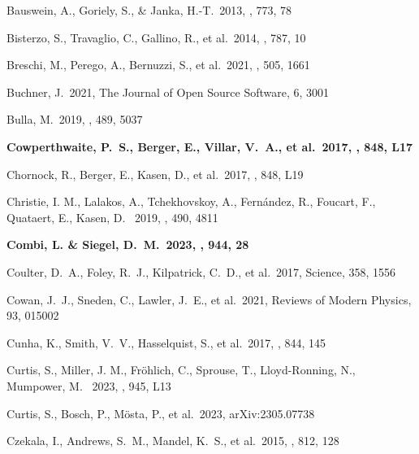 \documentclass[twocolumn,twocolappendix]{aastex63}
\begin{document}
{{\begin{thebibliography}{}
 Bauswein, A., Goriely, S., \& Janka, H.-T.\ 2013, \apj, 773, 78


 Bisterzo, S., Travaglio, C., Gallino, R., et al.\ 2014, \apj, 787, 10


 Breschi, M., Perego, A., Bernuzzi, S., et al.\ 2021, \mnras, 505, 1661

 Buchner, J.\ 2021, The Journal of Open Source Software, 6, 3001


 Bulla, M.\ 2019, \mnras, 489, 5037


 \textbf{Cowperthwaite, P.~S., Berger, E., Villar, V.~A., et al.\ 2017, \apjl, 848, L17}


 Chornock, R., Berger, E., Kasen, D., et al.\ 2017, \apjl, 848, L19


 Christie, I. M., Lalakos, A., Tchekhovskoy, A., Fern\'andez, R., Foucart, F., Quataert, E., Kasen, D. \ 2019, \mnras, 490, 4811


 \textbf{Combi, L. \& Siegel, D.~M.\ 2023, \apj, 944, 28}


 Coulter, D.~A., Foley, R.~J., Kilpatrick, C.~D., et al.\ 2017, Science, 358, 1556


 Cowan, J.~J., Sneden, C., Lawler, J.~E., et al.\ 2021, Reviews of Modern Physics, 93, 015002


 Cunha, K., Smith, V.~V., Hasselquist, S., et al.\ 2017, \apj, 844, 145


 Curtis, S., Miller, J. M., Fr\"ohlich, C., 
Sprouse, T., Lloyd-Ronning, N., Mumpower, M. \ 2023, \apjl, 945, L13


 Curtis, S., Bosch, P., M{\"o}sta, P., et al.\ 2023, arXiv:2305.07738


 Czekala, I., Andrews, S.~M., Mandel, K.~S., et al.\ 2015, \apj, 812, 128



\end{thebibliography}}}
\end{document}

